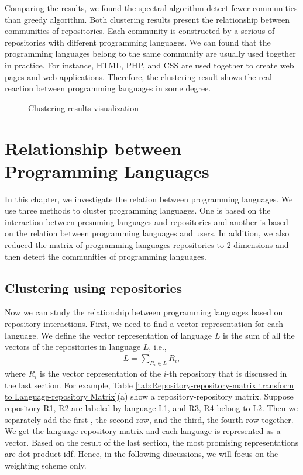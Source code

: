 \documentclass[12pt,oneside,final]{vlsithesis}
\begin{document}
Comparing the results, we found the spectral algorithm detect fewer communities than greedy algorithm. Both clustering results present the relationship between communities of repositories. Each community is constructed by a serious of repositories with different programming languages. We can found that the programming languages belong to the same community are usually used together in practice. For instance, HTML, PHP, and CSS are used together to create web pages and web applications. Therefore, the clustering result shows the real reaction between programming languages in some degree. 

\begin{figure*}
	\centering
	\caption{Clustering results visualization}
	\label{fig:Clustering results visualization}
\end{figure*}
 
\chapter{Relationship between Programming Languages}\label{chapter:relationship between programming languages}
In this chapter, we investigate the relation between programming languages. We use three methods to cluster programming languages. One is based on the interaction between presuming languages and repositories and another is based on the relation between programming languages and users. In addition, we also reduced the matrix of programming languages-repositories to 2 dimensions and then detect the communities of programming languages. 
\section{Clustering using repositories}\label{subsection:Clustering using repositories}
Now we can study the relationship between programming languages based on repository interactions.  First, we need to find a vector representation for each language. We define the vector representation of language $L$ is the sum of all the vectors of the repositories in language $L$, i.e., 
\begin{align}
L=\sum_{R_i\in L} R_i, 
\end{align}
where $R_i$ is the vector representation of the $i$-th repository that is discussed in the last section. For example, Table \ref{tab:Repository-repository-matrix transform to Language-repository Matrix}(a) show a repository-repository matrix. Suppose repository R1, R2 are labeled by language L1, and R3, R4 belong to L2. Then we separately add the first , the second row, and the third, the fourth row together. We get the language-repository matrix and each language is represented as a vector. Based on the result of the last section, the most promising representations are dot product-idf. Hence, in the following discussions, we will focus on the weighting scheme only. 
\end{document}
